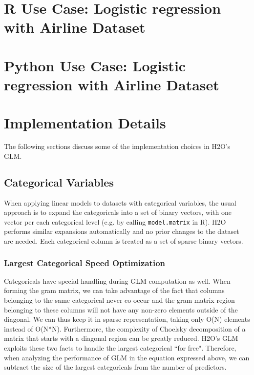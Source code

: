 
\section{R Use Case:  Logistic regression with Airline Dataset}


\section{Python Use Case:  Logistic regression with Airline Dataset}


\section{Implementation Details}

The following sections discuss some of the implementation choices in H2O's GLM.

\subsection{Categorical Variables}

When applying linear models to datasets with categorical variables, the usual approach is to expand the
categoricals into a set of binary vectors, with one vector per each categorical level (e.g. by calling
{\texttt{model.matrix}} in R). H2O performs similar expansions automatically and no prior changes to the dataset
are needed. Each categorical column is treated as a set of sparse binary vectors.

\subsubsection{Largest Categorical Speed Optimization}

Categoricals have special handling during GLM computation as well. When forming the gram matrix, we can take
advantage of the fact that columns belonging to the same categorical never co-occur and the gram matrix region
belonging to these columns will not have any non-zero elements outside of the diagonal. We can thus keep it in
sparse representation, taking only O(N) elements instead of O(N*N). Furthermore, the complexity of Choelsky
decomposition of a matrix that starts with a diagonal region can be greatly reduced. H2O's GLM exploits these two
facts to handle the largest categorical ``for free". Therefore, when analyzing the performance of GLM in the
equation expressed above, we can subtract the size of the largest categoricals from the number of predictors.

